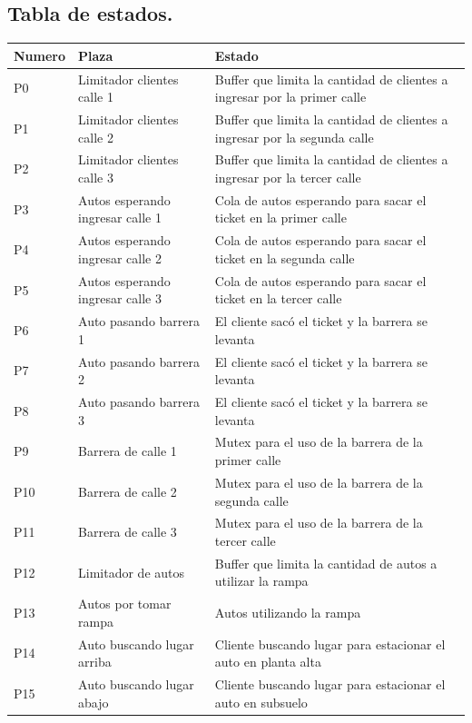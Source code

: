 \documentclass[12pt,a4paper]{article}
\begin{document}
\subsection{Tabla de estados.}
\begin{table}[H]
\centering
\begin{tabular}[width=15cm]{ || C{1.5cm} | L{5cm} | L{8.5cm} || }
\hline
	Numero & Plaza & Estado  \\ \hline
	P0 & Limitador clientes calle 1 & Buffer que limita la cantidad de clientes a ingresar por la primer calle  \\ \hline
	P1 & Limitador clientes calle 2 & Buffer que limita la cantidad de clientes a ingresar por la segunda calle \\ \hline
	P2 & Limitador clientes calle 3 & Buffer que limita la cantidad de clientes a ingresar por la tercer calle  \\ \hline
	P3 & Autos esperando ingresar calle 1 & Cola de autos esperando para sacar el ticket en la primer calle  \\ \hline
	P4 & Autos esperando ingresar calle 2 & Cola de autos esperando para sacar el ticket en la segunda calle\\ \hline
	P5 & Autos esperando ingresar calle 3 & Cola de autos esperando para sacar el ticket en la tercer calle \\ \hline
	P6 & Auto pasando barrera 1 & El cliente sacó el ticket y la barrera se levanta  \\ \hline
	P7 & Auto pasando barrera 2 & El cliente sacó el ticket y la barrera se levanta   \\ \hline
	P8 & Auto pasando barrera 3 & El cliente sacó el ticket y la barrera se levanta  \\ \hline
	P9 & Barrera de calle 1 & Mutex para el uso de la barrera de la primer calle   \\ \hline
	P10 & Barrera de calle 2 & Mutex para el uso de la barrera de la segunda calle  \\ \hline
	P11 & Barrera de calle 3 & Mutex para el uso de la barrera de la tercer calle  \\ \hline
	P12 & Limitador de autos & Buffer que limita la cantidad de autos a utilizar la rampa  \\ \hline
	P13 & Autos por tomar rampa & Autos utilizando la rampa \\ \hline
	P14 & Auto buscando lugar arriba & Cliente buscando lugar para estacionar el auto en planta alta \\ \hline
	P15 & Auto buscando lugar abajo & Cliente buscando lugar para estacionar el auto en subsuelo \\ \hline

\end{tabular}
\end{table}
\end{document}
